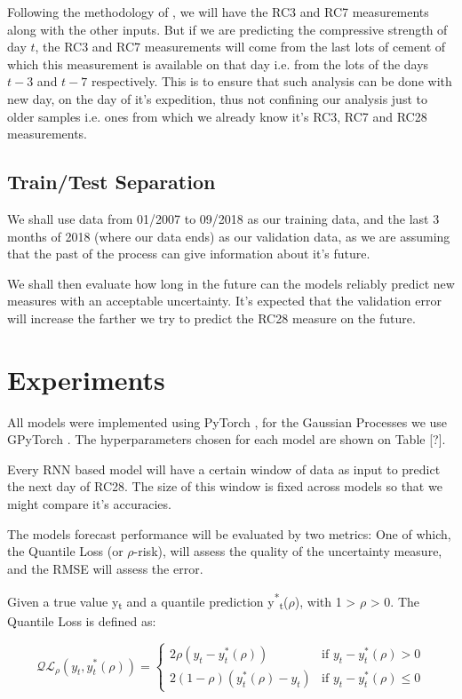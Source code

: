 \documentclass[a4paper]{article}
\begin{document}
Following the methodology of \cite{greciaLin}, we will have the RC3 and RC7 measurements along with the other inputs. But if we are predicting the compressive strength of day \(t\), the RC3 and RC7 measurements
will come from the last lots of cement of which this measurement is available on that day i.e. from the lots of the days \(t-3\) and \(t-7\) respectively. This is to ensure that such analysis
can be done with new day, on the day of it's expedition, thus not confining our analysis just to older samples i.e. ones from which we already know it's RC3, RC7 and RC28 measurements. 

\subsection{Train/Test Separation}
\label{sec:orgb00d5fa}
We shall use data from 01/2007 to 09/2018 as our training data, and the last 3 months of 2018 (where our data ends) as our validation data, as we are assuming that the past of the process
can give information about it's future.

We shall then evaluate how long in the future can the models reliably predict new measures with an acceptable uncertainty.
It's expected that the validation error will increase the farther we try to predict the RC28 measure on the future.

\section{Experiments}
\label{sec:orge2fc0dd}

All models were implemented using PyTorch \cite{pytorch}, for the Gaussian Processes we use GPyTorch \cite{gpytorch}. The hyperparameters chosen for each model are shown on Table [?]. 

Every RNN based model will have a certain window of data as input to predict the next day of RC28. The size of this window is fixed across models so that we might compare it's accuracies. 

The models forecast performance will be evaluated by two metrics: One of which, the Quantile Loss (or \(\rho\)-risk), will assess the quality of the uncertainty measure,
and the RMSE will assess the error. 

Given a true value y\textsubscript{t} and a quantile prediction y\textsuperscript{*}\textsubscript{t}(\(\rho\)), with  1 > \(\rho\) > 0. The Quantile Loss is defined as:


\begin{equation*}
  \mathcal{QL}_{\rho}(y_{t},y^{*}_{t}(\rho)) =
\begin{cases}
  2 \rho(y_{t} - y^{*}_{t}(\rho)) & \text{if }  y_{t} - y^{*}_{t}(\rho) > 0 \\
  2 (1 - \rho)(y^{*}_{t}(\rho) - y_{t}) & \text{if } y_{t} - y^{*}_{t}(\rho) \leq 0
\end{cases}
\end{equation*}
\end{document}
